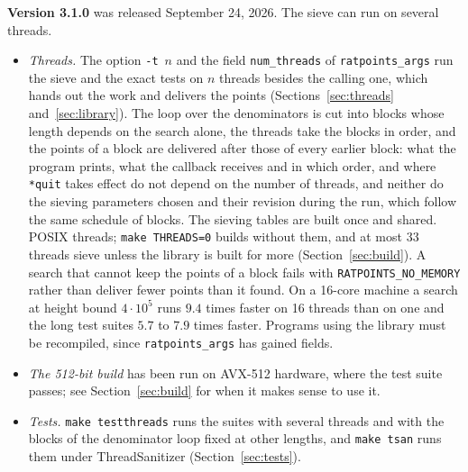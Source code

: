 \documentclass[12pt,a4paper,oneside]{amsart}
\begin{document}
\textbf{Version 3.1.0} was released September 24, 2026. The sieve can run on
several threads.
\begin{itemize}
  \item \emph{Threads.} The option \verb+-t+~$n$ and the field
        \texttt{num\_threads} of \texttt{ratpoints\_args} run the sieve
        and the exact tests on $n$ threads besides the calling one, which
        hands out the work and delivers the points
        (Sections~\ref{sec:threads} and~\ref{sec:library}). The loop over
        the denominators is cut into blocks whose length depends on the
        search alone, the threads take the blocks in order, and the points
        of a block are delivered after those of every earlier block: what
        the program prints, what the callback receives and in which order,
        and where \texttt{*quit} takes effect do not depend on the number
        of threads, and neither do the sieving parameters chosen and their
        revision during the run, which follow the same schedule of blocks.
        The sieving tables are built once and shared. POSIX threads;
        \texttt{make THREADS=0} builds without them, and at most $33$
        threads sieve unless the library is built for more
        (Section~\ref{sec:build}). A search that cannot
        keep the points of a block fails with \texttt{RATPOINTS\_NO\_MEMORY}
        rather than deliver fewer points than it found. On a 16-core
        machine a search at height bound $4\cdot10^5$ runs $9.4$ times
        faster on 16 threads than on one and the long test suites $5.7$
        to $7.9$ times faster. Programs using the library must
        be recompiled, since \texttt{ratpoints\_args} has gained fields.
  \item \emph{The 512-bit build} has been run on AVX-512 hardware, where the
        test suite passes; see Section~\ref{sec:build} for when it makes sense
        to use it.
  \item \emph{Tests.} \texttt{make testthreads} runs the suites with several
        threads and with the blocks of the denominator loop fixed at other
        lengths, and \texttt{make tsan} runs them under ThreadSanitizer
        (Section~\ref{sec:tests}).
\end{itemize}
\end{document}
